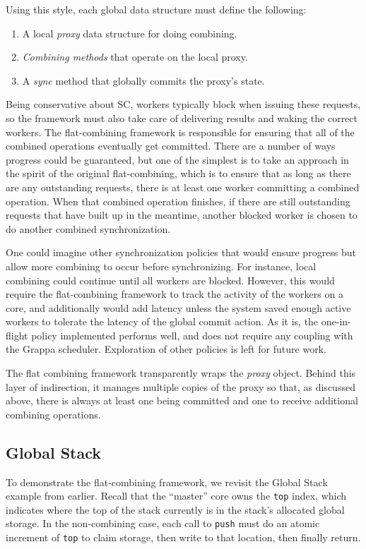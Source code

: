 Using this style, each global data structure must define the following:
\begin{enumerate}
  \item A local \emph{proxy} data structure for doing combining.
  \item \emph{Combining methods} that operate on the local proxy.
  \item A \emph{sync} method that globally commits the proxy's state.
\end{enumerate}

Being conservative about SC, workers typically block when issuing these requests, so the framework must also take care of delivering results and waking the correct workers. The flat-combining framework is responsible for ensuring that all of the combined operations eventually get committed. There are a number of ways progress could be guaranteed, but one of the simplest is to take an approach in the spirit of the original flat-combining, which is to ensure that as long as there are any outstanding requests, there is at least one worker committing a combined operation. When that combined operation finishes, if there are still outstanding requests that have built up in the meantime, another blocked worker is chosen to do another combined synchronization.

One could imagine other synchronization policies that would ensure progress but allow more combining to occur before synchronizing. For instance, local combining could continue until all workers are blocked. However, this would require the flat-combining framework to track the activity of the workers on a core, and additionally would add latency unless the system saved enough active workers to tolerate the latency of the global commit action. As it is, the one-in-flight policy implemented performs well, and does not require any coupling with the Grappa scheduler. Exploration of other policies is left for future work.

The flat combining framework transparently wraps the \emph{proxy} object. Behind this layer of indirection, it manages multiple copies of the proxy so that, as discussed above, there is always at least one being committed and one to receive additional combining operations.


\subsection{Global Stack}
To demonstrate the flat-combining framework, we revisit the Global Stack example from earlier. Recall that the ``master'' core owns the \texttt{top} index, which indicates where the top of the stack currently is in the stack's allocated global storage. In the non-combining case, each call to \texttt{push} must do an atomic increment of \texttt{top} to claim storage, then write to that location, then finally return. 



